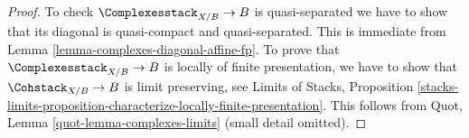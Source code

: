 \begin{proof}
To check $\Complexesstack_{X/B} \to B$ is quasi-separated we have to
show that its diagonal is quasi-compact and quasi-separated.
This is immediate from Lemma \ref{lemma-complexes-diagonal-affine-fp}.
To prove that $\Complexesstack_{X/B} \to B$ is locally of finite
presentation, we have to show that $\Cohstack_{X/B} \to B$
is limit preserving, see
Limits of Stacks, Proposition
\ref{stacks-limits-proposition-characterize-locally-finite-presentation}.
This follows from Quot, Lemma \ref{quot-lemma-complexes-limits}
(small detail omitted).
\end{proof}











